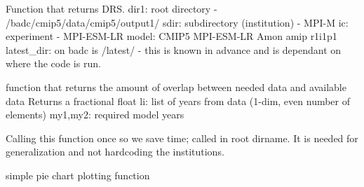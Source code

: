 \documentclass[letterpaper,10pt,english]{sphinxmanual}
\begin{document}

\begin{fulllineitems}
\label{\detokenize{index:cmip5datafinder.get_drs}}
Function that returns DRS.
dir1: root directory - /badc/cmip5/data/cmip5/output1/
sdir: subdirectory (institution) - MPI-M
ic: experiment - MPI-ESM-LR
model: CMIP5 MPI-ESM-LR Amon amip r1i1p1
latest\_dir: on badc is /latest/ - this is known in advance
and is dependant on where the code is run.

\end{fulllineitems}


\begin{fulllineitems}
\label{\detokenize{index:cmip5datafinder.get_overlap}}
function that returns the amount of overlap
between needed data and available data
Returns a fractional float
li: list of years from data (1-dim, even number of elements)
my1,my2: required model years

\end{fulllineitems}


\begin{fulllineitems}
\label{\detokenize{index:cmip5datafinder.lsladir}}
Calling this function once so we save time; called in root dirname.
It is needed for generalization and not hardcoding the institutions.

\end{fulllineitems}


\begin{fulllineitems}
\label{\detokenize{index:cmip5datafinder.plotter}}
simple pie chart plotting function

\end{fulllineitems}

\end{document}
